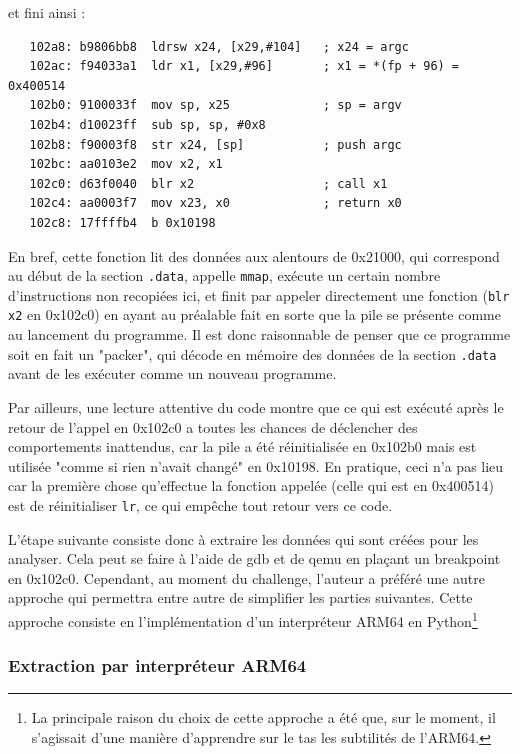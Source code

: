 \documentclass[a4paper,10pt]{article}
\begin{document}
et fini ainsi :

\begin{verbatim}
   102a8: b9806bb8  ldrsw x24, [x29,#104]   ; x24 = argc
   102ac: f94033a1  ldr x1, [x29,#96]       ; x1 = *(fp + 96) = 0x400514
   102b0: 9100033f  mov sp, x25             ; sp = argv
   102b4: d10023ff  sub sp, sp, #0x8
   102b8: f90003f8  str x24, [sp]           ; push argc
   102bc: aa0103e2  mov x2, x1
   102c0: d63f0040  blr x2                  ; call x1
   102c4: aa0003f7  mov x23, x0             ; return x0
   102c8: 17ffffb4  b 0x10198
\end{verbatim}

En bref, cette fonction lit des données aux alentours de 0x21000, qui correspond au début de la section \texttt{.data}, appelle \texttt{mmap}, exécute un certain nombre d'instructions non recopiées ici, et finit par appeler directement une fonction (\texttt{blr x2} en 0x102c0) en ayant au préalable fait en sorte que la pile se présente comme au lancement du programme. Il est donc raisonnable de penser que ce programme soit en fait un "packer", qui décode en mémoire des données de la section \texttt{.data} avant de les exécuter comme un nouveau programme.

Par ailleurs, une lecture attentive du code montre que ce qui est exécuté après le retour de l'appel en 0x102c0 a toutes les chances de déclencher des comportements inattendus, car la pile a été réinitialisée en 0x102b0 mais est utilisée "comme si rien n'avait changé" en 0x10198. En pratique, ceci n'a pas lieu car la première chose qu'effectue la fonction appelée (celle qui est en 0x400514) est de réinitialiser \texttt{lr}, ce qui empêche tout retour vers ce code.

L'étape suivante consiste donc à extraire les données qui sont créées pour les analyser. Cela peut se faire à l'aide de gdb et de qemu en plaçant un breakpoint en 0x102c0. Cependant, au moment du challenge, l'auteur a préféré une autre approche qui permettra entre autre de simplifier les parties suivantes. Cette approche consiste en l'implémentation d'un interpréteur ARM64 en Python\footnote{La principale raison du choix de cette approche a été que, sur le moment, il s'agissait d'une manière d'apprendre sur le tas les subtilités de l'ARM64.}

\subsubsection{Extraction par interpréteur ARM64}
\label{DecompressWithEmu}
\end{document}
